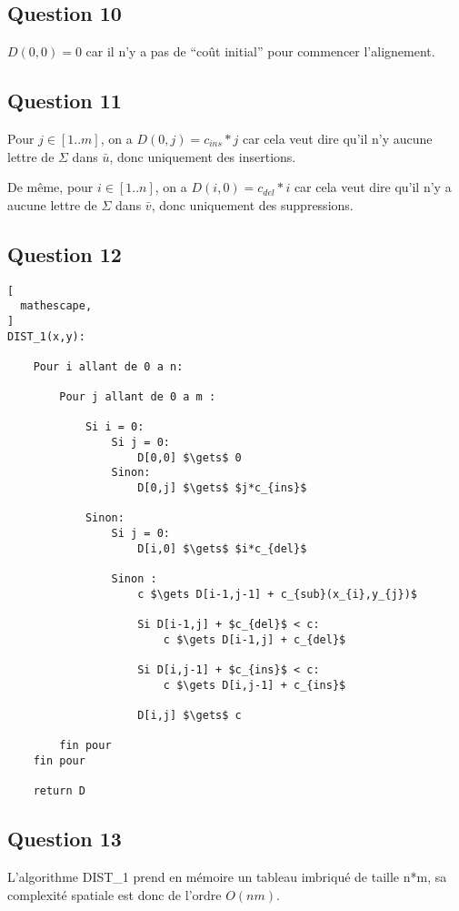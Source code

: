 \documentclass{report}
\begin{document}
\subsection*{Question 10}
$D(0,0)=0$  car il n'y a pas de ``coût initial'' pour commencer l'alignement.

\subsection*{Question 11}
Pour $j\in[1..m]$, on a $D(0,j)=c_{ins}*j$ car cela veut dire qu'il n'y aucune lettre de $ \Sigma$ dans $\bar{u}$, donc uniquement des insertions.

De même, pour  $i\in[1..n]$, on a $D(i,0)=c_{del}*i$ car cela veut dire qu'il n'y a  aucune lettre de $ \Sigma$ dans $\bar{v}$, donc uniquement des suppressions.

\clearpage

\subsection*{Question 12}
\begin{lstlisting}[
  mathescape,
]
DIST_1(x,y):

    Pour i allant de 0 a n:

        Pour j allant de 0 a m :
        
            Si i = 0:
                Si j = 0:
                    D[0,0] $\gets$ 0
                Sinon:
                    D[0,j] $\gets$ $j*c_{ins}$
        
            Sinon:
                Si j = 0:
                    D[i,0] $\gets$ $i*c_{del}$
                    
                Sinon :
                    c $\gets D[i-1,j-1] + c_{sub}(x_{i},y_{j})$
                    
                    Si D[i-1,j] + $c_{del}$ < c:
                        c $\gets D[i-1,j] + c_{del}$

                    Si D[i,j-1] + $c_{ins}$ < c:
                        c $\gets D[i,j-1] + c_{ins}$
                        
                    D[i,j] $\gets$ c
                    
        fin pour
    fin pour
    
    return D
\end{lstlisting}

\clearpage

\subsection*{Question 13}
L'algorithme DIST\_1 prend en mémoire un tableau imbriqué de taille n*m, sa complexité spatiale est donc de l'ordre $O(nm)$.
\end{document}
